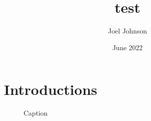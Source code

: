 \documentclass{article}
\title{test}
\author{Joel Johnson}
\date{June 2022}
\begin{document}
\maketitle

\section{Introductions}

\begin{figure}
    \centering
    \caption{Caption}
    \label{fig:my_label}
\end{figure}
\end{document}
